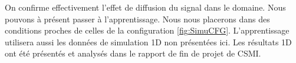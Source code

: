 On confirme effectivement l'effet de diffusion du signal dans le domaine. Nous pouvons à présent passer à l'apprentissage. Nous nous placerons dans des conditions proches de celles de la configuration \ref{fig:SimuCFG}. L'apprentissage utilisera aussi les données de simulation 1D non présentées ici. Les résultats 1D ont été présentés et analysés dans le rapport de fin de projet de CSMI.

